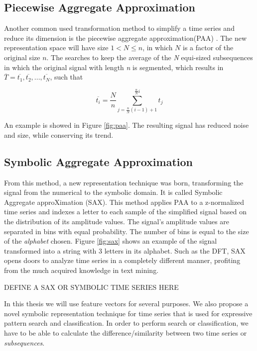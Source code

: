\subsection{Piecewise Aggregate Approximation}
\label{subsec:paa}

Another common used transformation method to simplify a time series and reduce its dimension is the piecewise aggregate approximation(PAA) \cite{paa}. The new representation space will have size $1 < N \leq n$, in which $N$ is a factor of the original size $n$. The searches to keep the average of the \textit{N} equi-sized subsequences in which the original signal with length \textit{n} is segmented, which results in $\overline{T} = \overline{t_1}, \overline{t_2}, ...,\overline{t_N}$, such that \cite{paa}

\begin{equation}
\overline{t_i} = \frac{N}{n} \sum^{\frac{n}{N}i}_{j=\frac{n}{N}(i-1)+1} t_j
\end{equation}

An example is showed in Figure \ref{fig:paa}. The resulting signal has reduced noise and size, while conserving its trend.

\subsection{Symbolic Aggregate Approximation}
\label{subsec:sax}

From this method, a new representation technique was born, transforming the signal from the numerical to the symbolic domain. It is called Symbolic Aggregate approXimation (SAX). This method applies PAA to a z-normalized time series and indexes a letter to each sample of the simplified signal based on the distribution of its amplitude values. The signal's amplitude values are separated in bins with equal probability. The number of bins is equal to the size of the \textit{alphabet} chosen. Figure \ref{fig:sax} shows an example of the signal transformed into a string with 3 letters in its alphabet. Such as the DFT, SAX opens doors to analyze time series in a completely different manner, profiting from the much acquired knowledge in text mining.

DEFINE A SAX OR SYMBOLIC TIME SERIES HERE

In this thesis we will use feature vectors for several purposes. We also propose a novel symbolic representation technique for time series that is used for expressive pattern search and classification. In order to perform search or classification, we have to be able to calculate the difference/similarity between two time series or \textit{subsequences}.

